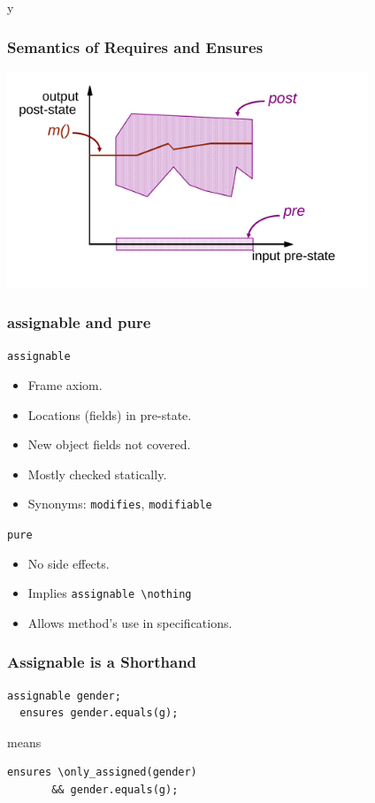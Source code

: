 \if y\MAKEHANDOUTS \documentclass[t,compress,landscape,handout]{beamer}
\begin{document}
\begin{frame}
\frametitle{Semantics of Requires and Ensures}
\includegraphics[width=4.25in]{correctimpl}
\end{frame}

\begin{frame}[fragile]
\frametitle{assignable and pure}

\lstinline!assignable!
\begin{itemize}
\item
Frame axiom.

\item
Locations (fields) in pre-state.

\item
New object fields not covered.

\item
Mostly checked statically.

\item
Synonyms: \lstinline!modifies!, \lstinline!modifiable!
\end{itemize}

\lstinline!pure!
\begin{itemize}
\item
No side effects.

\item
Implies \lstinline!assignable \nothing!

\item
Allows method's use in specifications.
\end{itemize}
\end{frame}

\begin{frame}[fragile]
\frametitle{Assignable is a Shorthand}
\begin{lstlisting}[mathescape=true]
  assignable gender;
  ensures gender.equals(g);
\end{lstlisting}

means

\begin{lstlisting}[mathescape=true]
  ensures \only_assigned(gender)
       && gender.equals(g);
\end{lstlisting}
\end{frame}
\end{document}
